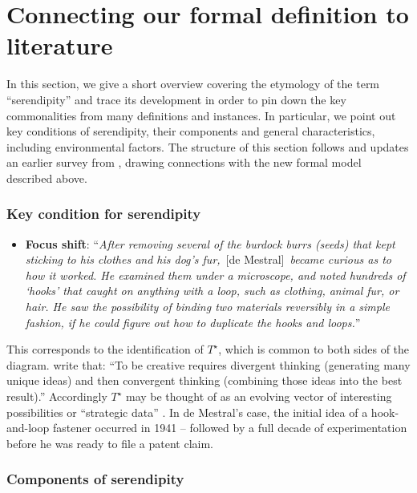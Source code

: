 \section{Connecting our formal definition to literature} \label{sec:connections-to-formal-definition}

In this section, we give a short overview covering the etymology of
the term ``serendipity'' and trace its development in order to pin
down the key commonalities from many definitions and instances.  In
particular, we point out key conditions of serendipity, their
components and general characteristics, including environmental
factors.  The structure of this section follows and updates an earlier
survey from , drawing connections with the
new formal model described above.

\subsubsection*{Key condition for serendipity}

\begin{itemize}
\item \textbf{Focus shift}: ``\emph{After removing several of the
  burdock burrs (seeds) that kept sticking to his clothes and his
  dog's fur,}~[de Mestral]~\emph{became curious as to how it
  worked. He examined them under a microscope, and noted hundreds of
  `hooks' that caught on anything with a loop, such as clothing,
  animal fur, or hair. He saw the possibility of binding two materials
  reversibly in a simple fashion, if he could figure out how to
  duplicate the hooks and loops.}''~\cite{wiki:velcro}
\end{itemize}
%
This corresponds to the identification of $T^\star$, which is common
to both sides of the diagram.   write that:
``To be creative requires divergent thinking (generating many unique
ideas) and then convergent thinking (combining those ideas into the
best result).''  Accordingly $T^\star$ may be thought of as an
evolving vector of interesting possibilities or ``strategic data''
\cite[p. 507]{merton1948bearing}.  In de Mestral's case, the initial
idea of a hook-and-loop fastener occurred in 1941 -- followed by a
full decade of experimentation before he was ready to file a patent
claim.

\subsubsection*{Components of serendipity}

